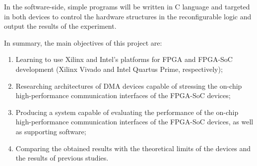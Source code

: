 In the software-side, simple programs will be written in C language and targeted in both devices to control the hardware structures in the reconfigurable logic and output the results of the experiment.

In summary, the main objectives of this project are:
\begin{enumerate}[nosep]
    \item Learning to use Xilinx and Intel's platforms for \ac{FPGA} and \ac{FPGA}-\ac{SoC} development (Xilinx Vivado and Intel Quartus Prime, respectively);
    \item Researching architectures of \ac{DMA} devices capable of stressing the on-chip high-performance communication interfaces of the \ac{FPGA}-\ac{SoC} devices;
    \item Producing a system capable of evaluating the performance of the on-chip high-performance communication interfaces of the \ac{FPGA}-\ac{SoC} devices, as well as supporting software;
    \item Comparing the obtained results with the theoretical limits of the devices and the results of previous studies.
\end{enumerate}
